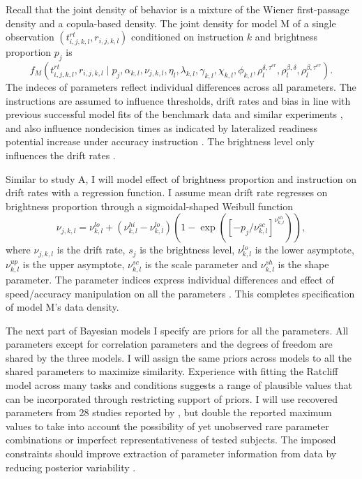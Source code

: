 \documentclass[12pt]{report}
\begin{document}
Recall that the joint density of behavior is a mixture of the Wiener first-passage density and a copula-based density. The joint density for model M of a single observation $(t_{i,j,k,l}^{rt}, r_{i,j,k,l})$ conditioned on instruction $k$ and brightness proportion $p_{j}$ is
\begin{equation}
f_M(t_{i,j,k,l}^{rt}, r_{i,j,k,l} \mid p_{j},\alpha_{k, l}, \nu_{j,k,l},\eta_l,\lambda_{k,l},\gamma_{k,l},\chi_{k,l},\phi_{k,l},\rho_l^{\delta,\tau^{er}},\rho_l^{\beta,\delta},\rho_l^{\beta,\tau^{er}}).
\end{equation}
The indeces of parameters reflect individual differences across all parameters. The instructions are assumed to influence thresholds, drift rates and bias in line with previous successful model fits of the benchmark data and similar experiments \citep{RatRou1998,VanTue2007,RatMck2008, Wag2009,VanTue2011}, and also influence nondecision times as indicated by lateralized readiness potential increase under accuracy instruction \citep{RinOsm2004}. The brightness level only influences the drift rates \citep{VosRot2004,RatMck2008,VanTue2011}.

Similar to study A, I will model effect of brightness proportion and instruction on drift rates with a regression function. I assume mean drift rate regresses on brightness proportion through a sigmoidal-shaped Weibull function 
%
\begin{equation}
\nu_{j,k,l} = \nu_{k,l}^{lo}+\left(\nu_{k,l}^{hi}-\nu_{k,l}^{lo}\right)   \left( 
1 - \operatorname{exp} 
\left( 
[-p_{j}/\nu_{k,l}^{sc}]^{\nu_{k,l}^{sh}}
\right)
\right),
\end{equation}
%
\noindent where $\nu_{j,k,l}$ is the drift rate, $s_{j}$ is the brightness level, $\nu_{k,l}^{lo}$ is the lower asymptote, $\nu_{k,l}^{up}$ is the upper asymptote, $\nu_{k,l}^{sc}$ is the scale parameter and $\nu_{k,l}^{sh}$ is the shape parameter. The parameter indices express individual differences and effect of speed/accuracy manipulation on all the parameters \citep{VanTue2011}. This completes specification of model M's data density.

The next part of Bayesian models I specify are priors for all the parameters. All parameters except for correlation parameters and the degrees of freedom are shared by the three models. I will assign the same priors across models to all the shared parameters to maximize similarity. Experience with fitting the Ratcliff model across many tasks and conditions suggests a range of plausible values that can be incorporated through restricting support of priors. I will use recovered parameters from 28 studies reported by \citet{MatWag2009}, but double the reported maximum values to take into account the possibility of yet unobserved rare parameter combinations or imperfect representativeness of tested subjects. The imposed constraints should improve extraction of parameter information from data by reducing posterior variability \citep{GelCar2013}. 
\end{document}
